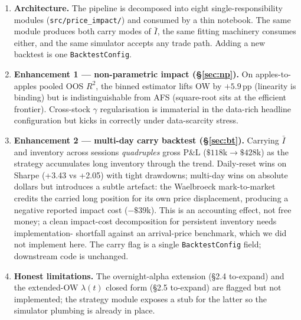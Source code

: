 \documentclass[11pt,a4paper]{article}
\begin{document}
\begin{enumerate}[leftmargin=2em]
  \item \textbf{Architecture.}  The pipeline is decomposed into eight
        single-responsibility modules (\texttt{src/price\_impact/}) and
        consumed by a thin notebook.  The same module produces both
        carry modes of $\bar I$, the same fitting machinery consumes
        either, and the same simulator accepts any trade path.  Adding
        a new backtest is one \texttt{BacktestConfig}.
  \item \textbf{Enhancement 1 --- non-parametric impact (\S\ref{sec:np}).}
        On apples-to-apples pooled OOS $R^2$, the binned estimator
        lifts OW by $+5.9$\,pp (linearity is binding) but is
        indistinguishable from AFS (square-root sits at the efficient
        frontier).  Cross-stock $\gamma$ regularisation is immaterial
        in the data-rich headline configuration but kicks in correctly
        under data-scarcity stress.
  \item \textbf{Enhancement 2 --- multi-day carry backtest
        (\S\ref{sec:bt}).}  Carrying $\bar I$ and inventory across
        sessions \emph{quadruples} gross P\&L ($\$118$k$\to\$428$k) as
        the strategy accumulates long inventory through the trend.
        Daily-reset wins on Sharpe (+3.43 vs +2.05) with tight
        drawdowns; multi-day wins on absolute dollars but introduces a
        subtle artefact: the Waelbroeck mark-to-market credits the
        carried long position for its own price displacement,
        producing a negative reported impact cost ($-\$39$k).  This is
        an accounting effect, not free money; a clean impact-cost
        decomposition for persistent inventory needs implementation-
        shortfall against an arrival-price benchmark, which we did
        not implement here.  The carry flag is a single
        \texttt{BacktestConfig} field; downstream code is unchanged.
  \item \textbf{Honest limitations.}  The overnight-alpha extension
        (\S2.4 to-expand) and the extended-OW $\lambda(t)$ closed form
        (\S2.5 to-expand) are flagged but not implemented; the
        strategy module exposes a stub for the latter so the simulator
        plumbing is already in place.
\end{enumerate}
\end{document}
